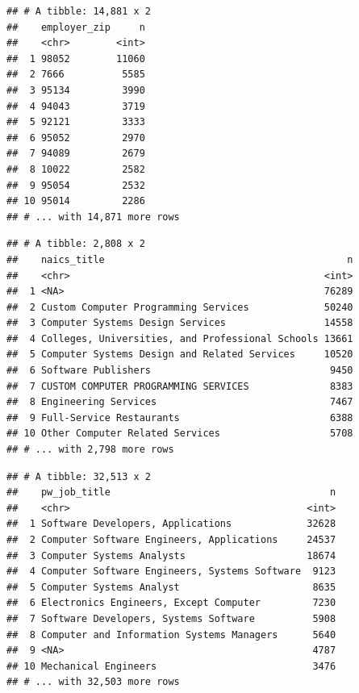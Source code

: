 \documentclass[]{article}
\newenvironment{Shaded}{\begin{snugshade}}{\end{snugshade}}
\newcommand{\KeywordTok}[1]{\textcolor[rgb]{0.13,0.29,0.53}{\textbf{#1}}}
\newcommand{\DataTypeTok}[1]{\textcolor[rgb]{0.13,0.29,0.53}{#1}}
\newcommand{\StringTok}[1]{\textcolor[rgb]{0.31,0.60,0.02}{#1}}
\newcommand{\CommentTok}[1]{\textcolor[rgb]{0.56,0.35,0.01}{\textit{#1}}}
\newcommand{\OperatorTok}[1]{\textcolor[rgb]{0.81,0.36,0.00}{\textbf{#1}}}
\newcommand{\NormalTok}[1]{#1}
\begin{document}
\begin{verbatim}
## # A tibble: 14,881 x 2
##    employer_zip     n
##    <chr>        <int>
##  1 98052        11060
##  2 7666          5585
##  3 95134         3990
##  4 94043         3719
##  5 92121         3333
##  6 95052         2970
##  7 94089         2679
##  8 10022         2582
##  9 95054         2532
## 10 95014         2286
## # ... with 14,871 more rows
\end{verbatim}

\begin{Shaded}
\end{Shaded}

\begin{verbatim}
## # A tibble: 2,808 x 2
##    naics_title                                          n
##    <chr>                                            <int>
##  1 <NA>                                             76289
##  2 Custom Computer Programming Services             50240
##  3 Computer Systems Design Services                 14558
##  4 Colleges, Universities, and Professional Schools 13661
##  5 Computer Systems Design and Related Services     10520
##  6 Software Publishers                               9450
##  7 CUSTOM COMPUTER PROGRAMMING SERVICES              8383
##  8 Engineering Services                              7467
##  9 Full-Service Restaurants                          6388
## 10 Other Computer Related Services                   5708
## # ... with 2,798 more rows
\end{verbatim}

\begin{Shaded}
\end{Shaded}

\begin{verbatim}
## # A tibble: 32,513 x 2
##    pw_job_title                                      n
##    <chr>                                         <int>
##  1 Software Developers, Applications             32628
##  2 Computer Software Engineers, Applications     24537
##  3 Computer Systems Analysts                     18674
##  4 Computer Software Engineers, Systems Software  9123
##  5 Computer Systems Analyst                       8635
##  6 Electronics Engineers, Except Computer         7230
##  7 Software Developers, Systems Software          5908
##  8 Computer and Information Systems Managers      5640
##  9 <NA>                                           4787
## 10 Mechanical Engineers                           3476
## # ... with 32,503 more rows
\end{verbatim}
\end{document}
